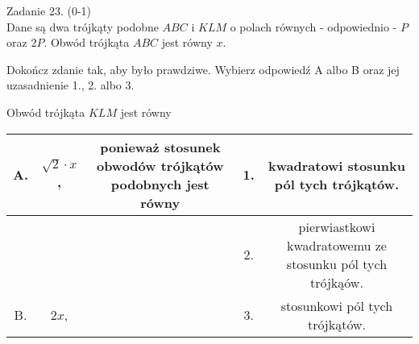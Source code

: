 \documentclass[10pt]{article}
\begin{document}
Zadanie 23. (0-1)\\
Dane są dwa trójkąty podobne \(A B C\) i \(K L M\) o polach równych - odpowiednio - \(P\) oraz \(2 P\). Obwód trójkąta \(A B C\) jest równy \(x\).

Dokończ zdanie tak, aby było prawdziwe. Wybierz odpowiedź A albo B oraz jej uzasadnienie 1., 2. albo 3.

Obwód trójkąta \(K L M\) jest równy

\begin{center}
\begin{tabular}{|c|c|c|c|c|}
\hline
\multirow[t]{2}{*}{A.} & \multirow[t]{2}{*}{\(\sqrt{2} \cdot x\),} & \multirow{3}{*}{ponieważ stosunek obwodów trójkątów podobnych jest równy} & 1. & kwadratowi stosunku pól tych trójkątów. \\
\hline
 &  &  & 2. & pierwiastkowi kwadratowemu ze stosunku pól tych trójkąów. \\
\hline
B. & \(2 x\), &  & 3. & stosunkowi pól tych trójkątów. \\
\hline
\end{tabular}
\end{center}
\end{document}
